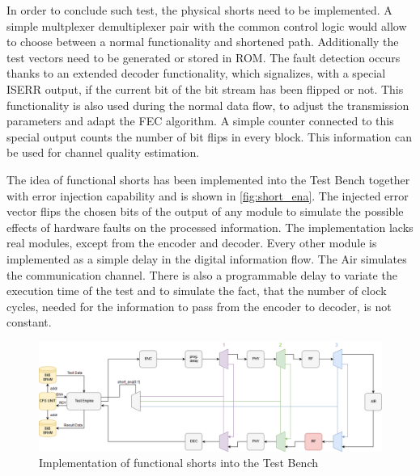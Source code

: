 In order to conclude such test, the physical shorts need to be implemented. A simple multplexer demultiplexer pair with the common control logic would allow to choose between a normal functionality and shortened path. Additionally the test vectors need to be generated or stored in ROM. The fault detection occurs thanks to an extended decoder functionality, which signalizes, with a special ISERR output, if the current bit of the bit stream has been flipped or not. This functionality is also used during the normal data flow, to adjust the transmission parameters and adapt the FEC algorithm. A simple counter connected to this special output counts the number of bit flips in every block. This information can be used for channel quality estimation. 

The idea of functional shorts has been implemented into the Test Bench together with error injection capability and is shown in \autoref{fig:short_ena}. The injected error vector flips the chosen bits of the output of any module to simulate the possible effects of hardware faults on the processed information. The implementation lacks real modules, except from the encoder and decoder. Every other module is implemented as a simple delay in the digital information flow. The Air simulates the communication channel. There is also a programmable delay to variate the execution time of the test and to simulate the fact, that the number of clock cycles, needed for the information to pass from the encoder to decoder, is not constant.

\begin{figure}[h]
\centering
\includegraphics[width=\textwidth]{figures/Short_ena_err.png}
\caption{Implementation of functional shorts into the Test Bench}
\label{fig:short_ena}
\end{figure}

